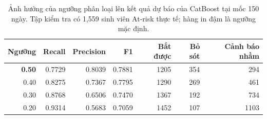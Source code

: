 \begin{table}[H]
  \centering
  \caption{Ảnh hưởng của ngưỡng phân loại lên kết quả dự báo của CatBoost tại mốc 150 ngày. Tập kiểm tra có 1{,}559 sinh viên At-risk thực tế; hàng in đậm là ngưỡng mặc định.}
  \label{tab:threshold}
  \small
  \begin{tabular}{rrrrrrr}
    \toprule
    \textbf{Ngưỡng} & \textbf{Recall} & \textbf{Precision} & \textbf{F1} & \textbf{Bắt được} & \textbf{Bỏ sót} & \textbf{Cảnh báo nhầm} \\
    \midrule
    \textbf{0.50} & 0.7729 & 0.8039 & 0.7881 & 1205 & 354 & 294 \\
    0.40 & 0.8275 & 0.7367 & 0.7795 & 1290 & 269 & 461 \\
    0.30 & 0.8768 & 0.6506 & 0.7470 & 1367 & 192 & 734 \\
    0.20 & 0.9314 & 0.5683 & 0.7059 & 1452 & 107 & 1103 \\
    \bottomrule
  \end{tabular}
\end{table}
